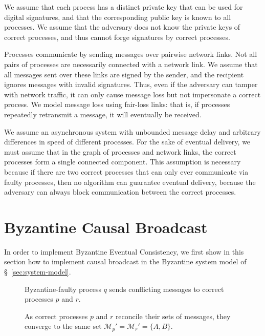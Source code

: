\documentclass[a4paper,anonymous,USenglish]{lipics-v2019}
\begin{document}
We assume that each process has a distinct private key that can be used for digital signatures, and that the corresponding public key is known to all processes.
We assume that the adversary does not know the private keys of correct processes, and thus cannot forge signatures by correct processes.

Processes communicate by sending messages over pairwise network links.
Not all pairs of processes are necessarily connected with a network link.
We assume that all messages sent over these links are signed by the sender, and the recipient ignores messages with invalid signatures.
Thus, even if the adversary can tamper with network traffic, it can only cause message loss but not impersonate a correct process.
We model message loss using fair-loss links: that is, if processes repeatedly retransmit a message, it will eventually be received.

We assume an asynchronous system with unbounded message delay and arbitrary differences in speed of different processes.
For the sake of eventual delivery, we must assume that in the graph of processes and network links, the correct processes form a single connected component.
This assumption is necessary because if there are two correct processes that can only ever communicate via faulty processes, then no algorithm can guarantee eventual delivery, because the adversary can always block communication between the correct processes.



\section{Byzantine Causal Broadcast}\label{sec:algorithm}

In order to implement Byzantine Eventual Consistency, we first show in this section how to implement causal broadcast in the Byzantine system model of \S~\ref{sec:system-model}.

\begin{figure}
    \centering
    
    \caption{Byzantine-faulty process $q$ sends conflicting messages to correct processes $p$ and $r$.}
    \label{fig:trivial1}
\end{figure}

\begin{figure}
    \centering
    
    \caption{As correct processes $p$ and $r$ reconcile their sets of messages, they converge to the same set $\mathcal{M}_p' = \mathcal{M}_r' = \{A,B\}$.}
    \label{fig:trivial2}
\end{figure}
\end{document}
